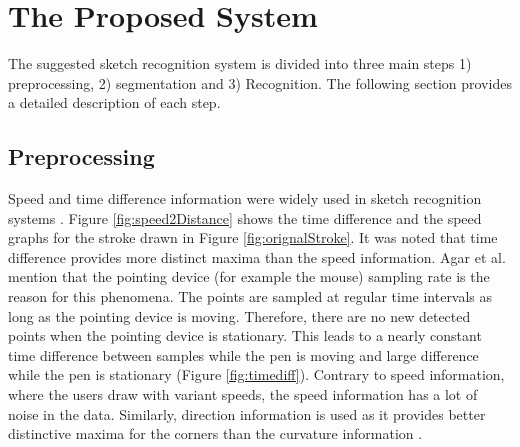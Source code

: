 \documentclass{article}
\begin{document}
\section{The Proposed System}
\label{Sysdisc}
 The suggested sketch recognition system is divided into three main steps 1) preprocessing, 2) segmentation and 3) Recognition. The following section provides a detailed description of each step.
 
\subsection{Preprocessing}
\label{Prepross}%
 Speed and time difference information were widely used in sketch recognition systems \cite{earlyprocess}. Figure \ref{fig:speed2Distance} shows the time difference and the speed graphs for the stroke drawn in Figure \ref{fig:orignalStroke}. It was noted that time difference provides more distinct maxima than the speed information. Agar et al. \cite{polygonfeedback31} mention that the pointing device (for example the mouse) sampling rate is the reason for this phenomena. The points are sampled at regular time intervals as long as the pointing device is moving. Therefore, there are no new detected points when the pointing device is stationary. This leads to a nearly constant time difference between samples while the pen is moving and large difference while the pen is stationary (Figure \ref{fig:timediff}). Contrary to speed information, where the users draw with variant speeds, the speed information has a lot of noise in the data.  Similarly, direction information is used as it provides better distinctive maxima for the corners than the curvature information \cite{meanshift10}.%
\end{document}
